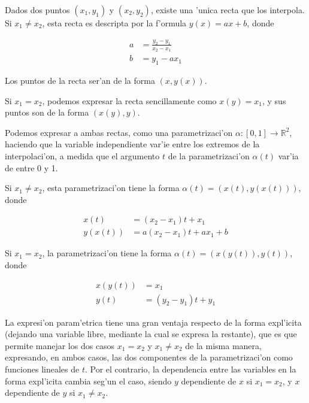 Dados dos puntos $(x_1, y_1)$ y $(x_2, y_2)$, existe una 'unica recta que los interpola. Si $x_1 \neq x_2$, esta recta es descripta por la f'ormula $y(x) = ax + b$, donde

\begin{align*}
a &= \frac{y_2 - y_1}{x_2 - x_1}\\
b &= y_1 - a x_1
\end{align*}

\noindent
Los puntos de la recta ser'an de la forma $(x, y(x))$.

Si $x_1 = x_2$, podemos expresar la recta sencillamente como $x(y) = x_1$, y sus puntos  son de la forma $(x(y), y)$.

Podemos expresar a ambas rectas, como una parametrizaci'on $\alpha: [0, 1] \to \mathbb{R}^2$, haciendo que la variable independiente var'ie entre los extremos de la interpolaci'on, a medida que el argumento $t$ de la parametrizaci'on $\alpha(t)$ var'ia de entre 0 y 1.

Si $x_1 \neq x_2$, esta parametrizaci'on tiene la forma $\alpha(t) = (x(t), y(x(t)))$, donde

\begin{align*}
x(t) &= (x_2 - x_1) t + x_1\\
y(x(t)) &= a(x_2 - x_1)t + ax_1 + b
\end{align*}

Si $x_1 = x_2$, la parametrizaci'on tiene la forma $\alpha(t) = (x(y(t)), y(t))$, donde

\begin{align*}
x(y(t)) &= x_1\\
y(t) &= (y_2 - y_1) t + y_1
\end{align*}

La expresi'on param'etrica tiene una gran ventaja respecto de la forma expl'icita (dejando una variable libre, mediante la cual se expresa la restante), que es que permite manejar los dos casos $x_1 = x_2$ y $x_1 \neq x_2$ de la misma manera, expresando, en ambos casos, las dos componentes de la parametrizaci'on como funciones lineales de $t$. Por el contrario, la dependencia entre las variables en la forma expl'icita cambia seg'un el caso, siendo $y$ dependiente de $x$ si $x_1 = x_2$, y $x$ dependiente de $y$ si $x_1 \neq x_2$.